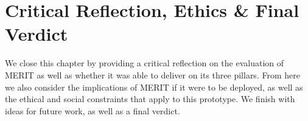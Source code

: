 \chapter{Critical Reflection, Ethics \& Final Verdict}
\label{ch:reflection}

We close this chapter by providing a critical reflection on the evaluation of MERIT as well as 
whether it was able to deliver on its three pillars. From here we also consider the implications 
of MERIT if it were to be deployed, as well as the ethical and social constraints that apply to 
this prototype. We finish with ideas for future work, as well as a final verdict.












